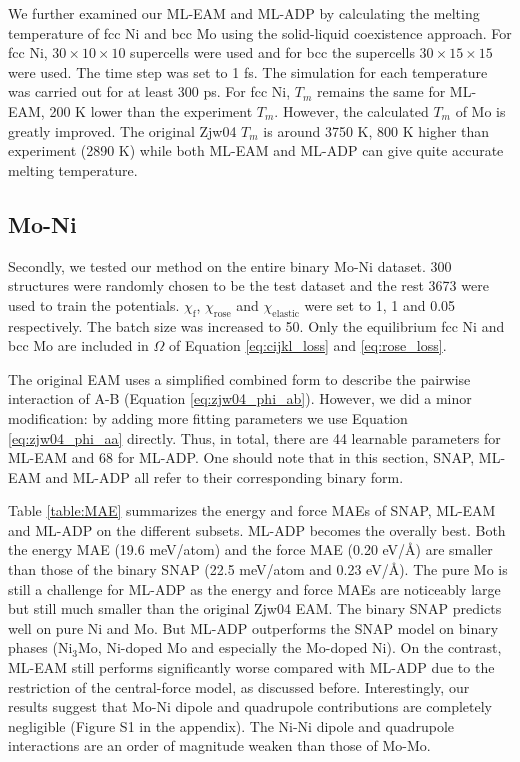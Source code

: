 \documentclass[final,3p,times]{elsarticle}
\begin{document}
We further examined our ML-EAM and ML-ADP by calculating the melting temperature
of fcc Ni and bcc Mo using the solid-liquid coexistence approach. For fcc Ni, 
$30 \times 10 \times 10$ supercells were used and for bcc the supercells 
$30 \times 15 \times 15$ were used. The time step was set to 1 fs. The 
simulation for each temperature was carried out for at least 300 ps. 
For fcc Ni, $T_{m}$ remains the 
same for ML-EAM, 200 K lower than the experiment $T_m$. However, the calculated 
$T_{m}$ of Mo is greatly improved. The original Zjw04 $T_{m}$ is around 3750 K, 
800 K higher than experiment (2890 K) while both ML-EAM and ML-ADP can give 
quite accurate melting temperature. 

% 
%
\subsection{Mo-Ni}
\label{sec:alloy}

Secondly, we tested our method on the entire binary Mo-Ni dataset. 300 
structures were randomly chosen to be the test dataset and the rest 3673 
were used to train the potentials. $\chi_{\mathrm{f}}$, $\chi_{\mathrm{rose}}$ 
and $\chi_{\mathrm{elastic}}$ were set to 1, 1 and 0.05 respectively. The batch 
size was increased to 50. Only the equilibrium fcc Ni and bcc Mo are included in 
$\Omega$ of Equation \ref{eq:cijkl_loss} and \ref{eq:rose_loss}.

The original EAM uses a simplified combined form to describe the pairwise 
interaction of A-B (Equation \ref{eq:zjw04_phi_ab}). However, we did a minor 
modification: by adding more fitting parameters we use Equation 
\ref{eq:zjw04_phi_aa} directly. Thus, in total, there are 44 learnable 
parameters for ML-EAM and 68 for ML-ADP. One should note that in this section, 
SNAP, ML-EAM and ML-ADP all refer to their corresponding binary form.

Table \ref{table:MAE} summarizes the energy and force MAEs of SNAP, ML-EAM and 
ML-ADP on the different subsets. ML-ADP becomes the overally best. 
Both the energy MAE (19.6 meV/atom) and the force MAE (0.20 eV/\AA) are smaller 
than those of the binary SNAP (22.5 meV/atom and 0.23 eV/\AA). 
The pure Mo is still a challenge for ML-ADP as the energy and force MAEs are 
noticeably large but still much smaller than the original Zjw04 EAM. The binary 
SNAP predicts well on pure Ni and Mo. But ML-ADP outperforms the SNAP model on 
binary phases (Ni$_3$Mo, Ni-doped Mo and especially the Mo-doped Ni).
On the contrast, ML-EAM still performs significantly worse compared with ML-ADP 
due to the restriction of the central-force model, as discussed before. 
Interestingly, our results suggest that Mo-Ni dipole and quadrupole 
contributions are completely negligible (Figure S1 in the appendix). The Ni-Ni 
dipole and quadrupole interactions are an order of magnitude weaken than those 
of Mo-Mo. 
\end{document}
